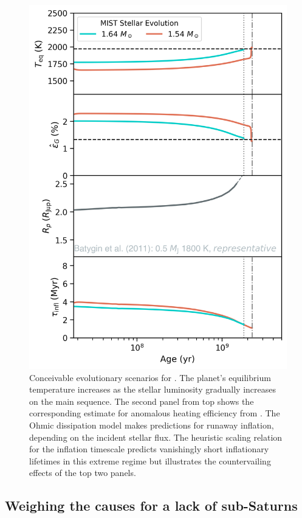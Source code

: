 \documentclass[twocolumn]{aastex631}
\newcommand{\hatpb}{\object{HAT-P-67 b}}
\begin{document}
\begin{figure}
    \includegraphics[width=\linewidth]{figures/reinflation_MIST.png}
    \caption{Conceivable evolutionary scenarios for \hatpb.  The planet's equilibrium temperature increases as the stellar luminosity gradually increases on the main sequence.  The second panel from top shows the corresponding estimate for anomalous heating efficiency from \citet{2018AJ....155..214T}. The Ohmic dissipation model makes predictions for runaway inflation, depending on the incident stellar flux.  The heuristic scaling relation for the inflation timescale predicts vanishingly short inflationary lifetimes in this extreme regime but illustrates the countervailing effects of the top two panels.}
    \label{fig:OhmicInflate}
\end{figure}


\subsection{Weighing the causes for a lack of sub-Saturns}\label{secLackofSaturns}
\end{document}
